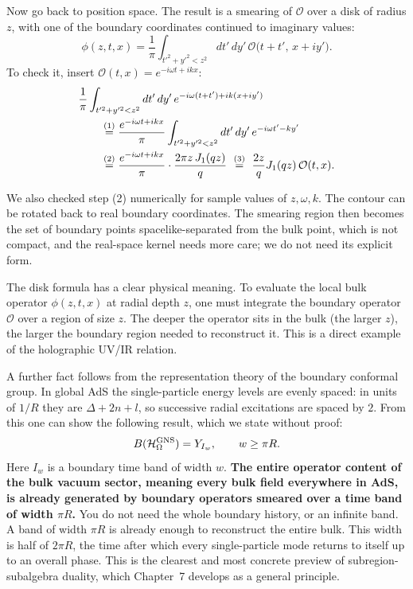 Now go back to position space. The result is a smearing of $\mathcal O$ over a disk of radius $z$, with one of
the boundary coordinates continued to imaginary values:
\begin{equation*}
\phi(z,t,x) = \frac{1}{\pi} \int_{t'^2 + y'^2 < z^2} dt'\, dy' \, \mathcal{O}\big(t + t',\, x + i y'\big) .
\end{equation*}
To check it, insert $\mathcal O(t,x)=e^{-i\omega t+ikx}$:
\begin{align}
&\frac{1}{\pi} \int_{t'^2 + y'^2 < z^2} dt'\,dy'\, e^{-i\omega(t+t')+ik(x+iy')} \notag\\
&\qquad\overset{(1)}{=} \frac{e^{-i\omega t+ikx}}{\pi}\int_{t'^2 + y'^2 < z^2} dt'\,dy'\,e^{-i\omega t'-ky'} \notag\\
&\qquad\overset{(2)}{=} \frac{e^{-i\omega t+ikx}}{\pi}\cdot\frac{2\pi z\,J_1(qz)}{q}
\ \overset{(3)}{=}\ \frac{2z}{q}J_1(qz)\,\mathcal O(t,x) . \notag
\end{align}
\quad
{}\quad
{}

We also checked step (2) numerically for sample values of $z,\omega,k$. The contour can be rotated back to
real boundary coordinates. The smearing region then becomes the set of boundary points spacelike-separated from
the bulk point, which is not compact, and the real-space kernel needs more care; we do not need its explicit
form.

The disk formula has a clear physical meaning. To evaluate the local bulk operator $\phi(z,t,x)$ at radial
depth $z$, one must integrate the boundary operator $\mathcal{O}$ over a region of size $z$. The deeper the
operator sits in the bulk (the larger $z$), the larger the boundary region needed to reconstruct it. This is a
direct example of the holographic UV/IR relation.

A further fact follows from the representation theory of the boundary conformal group. In global AdS the
single-particle energy levels are evenly spaced: in units of $1/R$ they are $\Delta+2n+l$, so successive radial
excitations are spaced by $2$. From this one can show the following result, which we state without proof:
\begin{equation}
B(\mathcal{H}_\Omega^{\text{GNS}}) = Y_{I_w}, \qquad w\ge\pi R .
\label{eq:ads-timeband}
\end{equation}
Here $I_w$ is a boundary time band of width $w$. \textbf{The entire operator content of the bulk vacuum
sector, meaning every bulk field everywhere in AdS, is already generated by boundary operators smeared over a
time band of width $\pi R$.} You do not need the whole boundary history, or an infinite band. A band of width
$\pi R$ is already enough to reconstruct the entire bulk. This width is half of $2\pi R$, the time after which
every single-particle mode returns to itself up to an overall phase. This
is the clearest and most concrete preview of subregion-subalgebra duality, which Chapter~7 develops as a
general principle.

